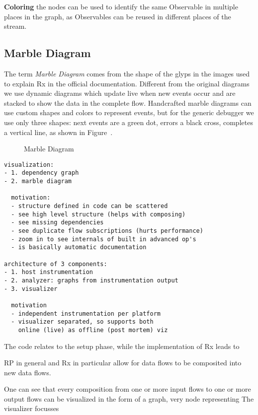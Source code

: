 \textbf{Coloring} the nodes can be used to identify the same Observable in multiple places in the graph, as Observables can be reused in different places of the stream.

\subsection{Marble Diagram}
The term \textit{Marble Diagram} comes from the shape of the glyps in the images used to explain Rx in the official documentation. Different from the original diagrams we use dynamic diagrams which update live when new events occur and are stacked to show the data in the complete flow. Handcrafted marble diagrams can use custom shapes and colors to represent events, but for the generic debugger we use only three shapes: next events are a green dot, errors a black cross, completes a vertical line, as shown in Figure~\cite{marblediagram}.

 \begin{figure}
	\centering
	
	\caption{Marble Diagram}
	\label{marblediagram}
\end{figure} 

{\color{red}
\begin{verbatim}
visualization:
- 1. dependency graph
- 2. marble diagram

  motivation:
  - structure defined in code can be scattered
  - see high level structure (helps with composing)
  - see missing dependencies
  - see duplicate flow subscriptions (hurts performance)
  - zoom in to see internals of built in advanced op's
  - is basically automatic documentation

architecture of 3 components:
- 1. host instrumentation
- 2. analyzer: graphs from instrumentation output
- 3. visualizer

  motivation
  - independent instrumentation per platform
  - visualizer separated, so supports both 
    online (live) as offline (post mortem) viz
\end{verbatim}
}


{\color{red}
 The code relates to the setup phase, while the implementation of Rx leads to

RP in general and Rx in particular allow for data flows to be composited into new data flows. 


One can see that every composition from one or more input flows to one or more output flows can be visualized in the form of a graph, very node representing 
The visualizer focusses 
}

